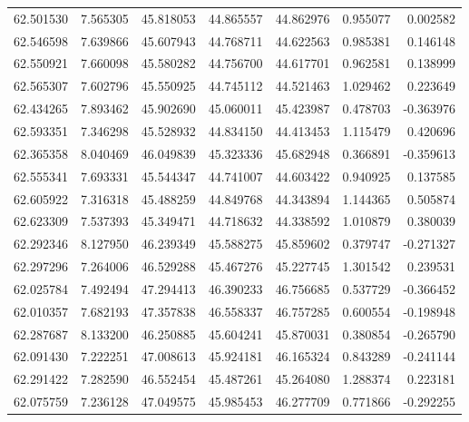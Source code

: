 \begin{tabular}{rrrrrrr}
 62.501530 &   7.565305 &         45.818053 &         44.865557 &         44.862976 &  0.955077 &  0.002582 \\
 62.546598 &   7.639866 &         45.607943 &         44.768711 &         44.622563 &  0.985381 &  0.146148 \\
 62.550921 &   7.660098 &         45.580282 &         44.756700 &         44.617701 &  0.962581 &  0.138999 \\
 62.565307 &   7.602796 &         45.550925 &         44.745112 &         44.521463 &  1.029462 &  0.223649 \\
 62.434265 &   7.893462 &         45.902690 &         45.060011 &         45.423987 &  0.478703 & -0.363976 \\
 62.593351 &   7.346298 &         45.528932 &         44.834150 &         44.413453 &  1.115479 &  0.420696 \\
 62.365358 &   8.040469 &         46.049839 &         45.323336 &         45.682948 &  0.366891 & -0.359613 \\
 62.555341 &   7.693331 &         45.544347 &         44.741007 &         44.603422 &  0.940925 &  0.137585 \\
 62.605922 &   7.316318 &         45.488259 &         44.849768 &         44.343894 &  1.144365 &  0.505874 \\
 62.623309 &   7.537393 &         45.349471 &         44.718632 &         44.338592 &  1.010879 &  0.380039 \\
 62.292346 &   8.127950 &         46.239349 &         45.588275 &         45.859602 &  0.379747 & -0.271327 \\
 62.297296 &   7.264006 &         46.529288 &         45.467276 &         45.227745 &  1.301542 &  0.239531 \\
 62.025784 &   7.492494 &         47.294413 &         46.390233 &         46.756685 &  0.537729 & -0.366452 \\
 62.010357 &   7.682193 &         47.357838 &         46.558337 &         46.757285 &  0.600554 & -0.198948 \\
 62.287687 &   8.133200 &         46.250885 &         45.604241 &         45.870031 &  0.380854 & -0.265790 \\
 62.091430 &   7.222251 &         47.008613 &         45.924181 &         46.165324 &  0.843289 & -0.241144 \\
 62.291422 &   7.282590 &         46.552454 &         45.487261 &         45.264080 &  1.288374 &  0.223181 \\
 62.075759 &   7.236128 &         47.049575 &         45.985453 &         46.277709 &  0.771866 & -0.292255 \\

\end{tabular}
